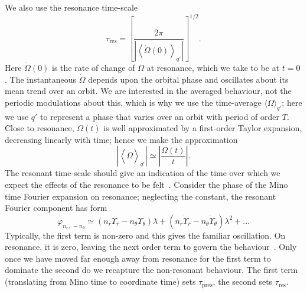 \documentclass[aps,prd,amsfonts,amssymb,amsmath,nofootinbib,showpacs,superscriptaddress,twocolumn]{revtex4}
\newcommand{\sub}[1]{\ensuremath{_\text{#1}}}
\begin{document}
We also use the resonance time-scale
\begin{equation}
\tau\sub{res} = \left[\frac{2\pi}{\left|\left\langle\dot{\Omega}(0)\right\rangle_{q'}\right|}\right]^{1/2}.
\label{eq:t-res}
\end{equation}
Here $\dot{\Omega}(0)$ is the rate of change of $\Omega$ at resonance, which we take to be at $t = 0$. The instantaneous $\dot{\Omega}$ depends upon the orbital phase and oscillates about its mean trend over an orbit. We are interested in the averaged behaviour, not the periodic modulations about this, which is why we use the time-average $\langle\dot{\Omega}\rangle_{q'}$; here we use $q'$ to represent a phase that varies over an orbit with period of order $T$. Close to resonance, $\Omega(t)$ is well approximated by a first-order Taylor expansion, decreasing linearly with time; hence we make the approximation
\begin{equation}
\left|\left\langle\dot{\Omega}\right\rangle_{q'}\right| \simeq \left|\frac{\Omega(t)}{t}\right|.
\end{equation}
The resonant time-scale should give an indication of the time over which we expect the effects of the resonance to be felt~\cite{Bosley1992}. Consider the phase of the Mino time Fourier expansion on resonance; neglecting the constant, the resonant Fourier component has form
\begin{equation}
\varphi_{n_r,\,-n_\theta} \simeq \left(n_r\Upsilon_r - n_\theta\Upsilon_\theta\right)\lambda + \left(n_r\dot{\Upsilon}_r - n_\theta\dot{\Upsilon}_\theta\right)\lambda^2 + \ldots
\end{equation}
Typically, the first term is non-zero and this gives the familiar oscillation. On resonance, it is zero, leaving the next order term to govern the behaviour~\cite{Flanagan2012}. Only once we have moved far enough away from resonance for the first term to dominate the second do we recapture the non-resonant behaviour. The first term (translating from Mino time to coordinate time) sets $\tau\sub{pres}$, the second sets $\tau\sub{res}$.
\end{document}
